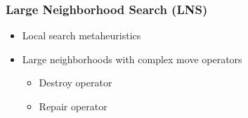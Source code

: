 \documentclass[aspectratio=1610]{beamer}
\newcommand{\important}[1]{{\color{green!60!black}#1}}
\let\oldfootnotesize\footnotesize
\renewcommand*{\footnotesize}{\oldfootnotesize\fontsize{6}{4}\selectfont}
\renewcommand{\footnotesize}{\scriptsize}
\begin{document}
\begin{frame}[noframenumbering]
	\frametitle{Large Neighborhood Search (LNS) \\ \footnotesize{\textcolor{gray}{\cite{Shaw:1998, Pisinger:2010}}}}

\begin{itemize}
	\item Local search metaheuristics
	\item Large neighborhoods with \important{complex move operators}
		\begin{itemize}
			\item Destroy operator
			\item Repair operator
		\end{itemize}
\end{itemize}


\end{frame}
\end{document}
